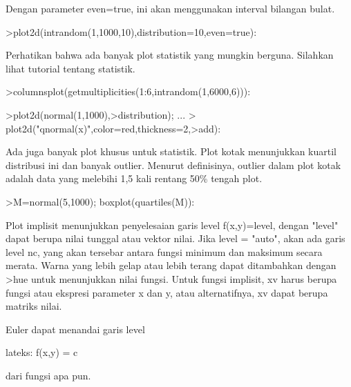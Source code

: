 \documentclass{article}
\begin{document}
\begin{eulernotebook}
\begin{eulercomment}
\begin{eulercomment}
\begin{eulercomment}
\begin{eulercomment}
\begin{eulercomment}
\begin{eulercomment}
\begin{eulercomment}
\begin{eulercomment}
\begin{eulercomment}
\begin{eulercomment}
\begin{eulercomment}
\begin{eulercomment}
\begin{eulercomment}
\begin{eulercomment}
\begin{eulercomment}
Dengan parameter even=true, ini akan menggunakan interval bilangan
bulat.
\end{eulercomment}
\begin{eulerprompt}
>plot2d(intrandom(1,1000,10),distribution=10,even=true):
\end{eulerprompt}
\begin{eulercomment}
Perhatikan bahwa ada banyak plot statistik yang mungkin berguna.
Silahkan lihat tutorial tentang statistik.
\end{eulercomment}
\begin{eulerprompt}
>columnsplot(getmultiplicities(1:6,intrandom(1,6000,6))):
\end{eulerprompt}
\begin{eulerprompt}
>plot2d(normal(1,1000),>distribution); ...
>  plot2d("qnormal(x)",color=red,thickness=2,>add):
\end{eulerprompt}
\begin{eulercomment}
Ada juga banyak plot khusus untuk statistik. Plot kotak menunjukkan
kuartil distribusi ini dan banyak outlier. Menurut definisinya,
outlier dalam plot kotak adalah data yang melebihi 1,5 kali rentang
50\% tengah plot.
\end{eulercomment}
\begin{eulerprompt}
>M=normal(5,1000); boxplot(quartiles(M)):
\end{eulerprompt}
\begin{eulercomment}
Plot implisit menunjukkan penyelesaian garis level f(x,y)=level,
dengan "level" dapat berupa nilai tunggal atau vektor nilai. Jika
level = "auto", akan ada garis level nc, yang akan tersebar antara
fungsi minimum dan maksimum secara merata. Warna yang lebih gelap atau
lebih terang dapat ditambahkan dengan \textgreater{}hue untuk menunjukkan nilai
fungsi. Untuk fungsi implisit, xv harus berupa fungsi atau ekspresi
parameter x dan y, atau alternatifnya, xv dapat berupa matriks nilai.

Euler dapat menandai garis level

lateks: f(x,y) = c

dari fungsi apa pun.


\end{eulercomment}
\end{eulercomment}
\end{eulercomment}
\end{eulercomment}
\end{eulercomment}
\end{eulercomment}
\end{eulercomment}
\end{eulercomment}
\end{eulercomment}
\end{eulercomment}
\end{eulercomment}
\end{eulercomment}
\end{eulercomment}
\end{eulercomment}
\end{eulercomment}
\end{eulernotebook}
\end{document}
